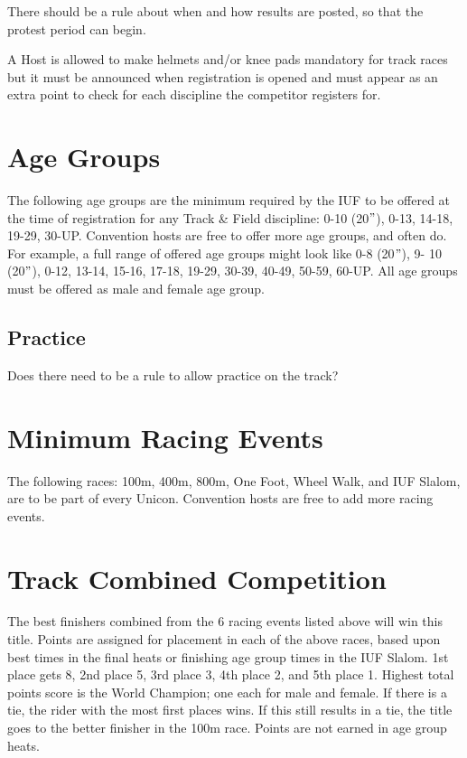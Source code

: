 \begin{comment-2016}
There should be a rule about when and how results are posted, so that the
protest period can begin.
\end{comment-2016}

A Host is allowed to make helmets and/or knee pads mandatory for track races but it must be announced when registration is opened and must appear as an extra point to check for each discipline the competitor registers for.

\section{Age Groups \label{subsec:track-field_racing-categories_age-groups}}
The following age groups are the minimum required by the IUF to be offered at the time of registration for any Track \& Field discipline: 0-10 (20$"$), 0-13, 14-18, 19-29, 30-UP.
Convention hosts are free to offer more age groups, and often do.
For example, a full range of offered age groups might look like 0-8 (20$"$), 9- 10 (20$"$), 0-12, 13-14, 15-16, 17-18, 19-29, 30-39, 40-49, 50-59, 60-UP.
All age groups must be offered as male and female age group.

\begin{comment-2016}
\section{Practice}

Does there need to be a rule to allow practice on the track?
\end{comment-2016}

\section{Minimum Racing Events \label{sec:track-field_minimum-racing-events}}
The following races: 100m, 400m, 800m, One Foot, Wheel Walk, and IUF Slalom, are to be part of every Unicon.
Convention hosts are free to add more racing events.

\section{Track Combined Competition}%
The best finishers combined from the 6 racing events listed above will win this title.
Points are assigned for placement in each of the above races, based upon best times in the final heats or finishing age group times in the IUF Slalom.
1st place gets 8, 2nd place 5, 3rd place 3, 4th place 2, and 5th place 1.
Highest total points score is the World Champion; one each for male and female.
If there is a tie, the rider with the most first places wins.
If this still results in a tie, the title goes to the better finisher in the 100m race.
Points are not earned in age group heats.

